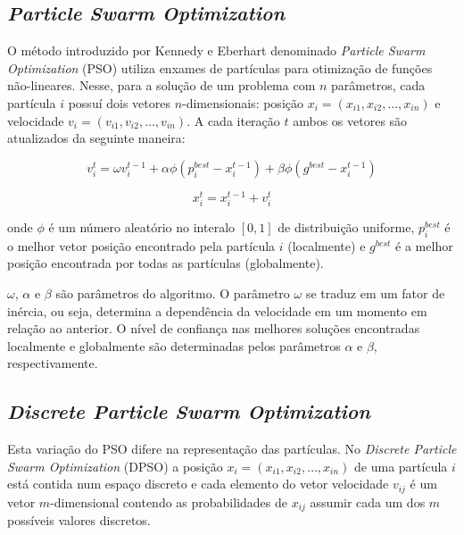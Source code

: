 \subsection{\textit{Particle Swarm Optimization}}

O método introduzido por Kennedy e Eberhart \cite{kennedy1995pso} denominado \textit{Particle Swarm Optimization} (PSO) utiliza enxames de partículas para otimização de funções não-lineares. Nesse, para a solução de um problema com $n$ parâmetros, cada partícula $i$ possuí dois vetores $n$-dimensionais: posição $x_{i} = (x_{i1}, x_{i2}, \dots, x_{in})$ e velocidade $v_{i} = (v_{i1}, v_{i2}, \dots, v_{in})$. A cada iteração $t$ ambos os vetores são atualizados da seguinte maneira:

\begin{equation}
\label{eq:pso-vel}
v_{i}^{t} = \omega v_{i}^{t-1} + \alpha \phi (p_{i}^{best} - x_{i}^{t-1}) + \beta \phi (g^{best} - x_{i}^{t-1})
\end{equation}

\begin{equation}
\label{eq:pso-pos}
x_{i}^{t} = x_{i}^{t-1} + v_{i}^{t}
\end{equation}

onde $\phi$ é um número aleatório no interalo $[0,1]$ de distribuição uniforme, $p_{i}^{best}$ é o melhor vetor posição encontrado pela partícula $i$ (localmente) e $g^{best}$ é a melhor posição encontrada por todas as partículas (globalmente).

$\omega$, $\alpha$ e $\beta$ são parâmetros do algoritmo. O parâmetro $\omega$ se traduz em um fator de inércia, ou seja, determina a dependência da velocidade em um momento em relação ao anterior. O nível de confiança nas melhores soluções encontradas localmente e globalmente são determinadas pelos parâmetros $\alpha$ e $\beta$, respectivamente.

\subsection{\textit{Discrete Particle Swarm Optimization}}
\label{sub:dpso}

Esta variação do PSO difere na representação das partículas. No \textit{Discrete Particle Swarm Optimization} (DPSO) a posição $x_{i} = (x_{i1}, x_{i2}, \dots, x_{in})$ de uma partícula $i$ está contida num espaço discreto e cada elemento do vetor velocidade $v_{ij}$ é um vetor $m$-dimensional contendo as probabilidades de $x_{ij}$ assumir cada um dos $m$ possíveis valores discretos.

